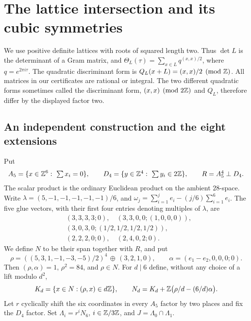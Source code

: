 \section{The lattice intersection and its cubic symmetries}
\label{sec:B}

We use positive definite lattices with roots of squared length two. Thus
\(\det L\) is the determinant of a Gram matrix, and
\(\Theta_L(\tau)=\sum_{x\in L}q^{(x,x)/2}\), where
\(q=e^{2\pi i\tau}\). The quadratic discriminant form is
\(Q_L(x+L)=(x,x)/2\pmod{\mathbb Z}\). All matrices in our certificates
are rational or integral. The two different quadratic forms sometimes
called the discriminant form, \((x,x)\pmod{2\mathbb Z}\) and \(Q_L\),
therefore differ by the displayed factor two.

\subsection{An independent construction and the eight extensions}

Put
\[
 A_5=\{x\in\mathbb Z^6:\ \textstyle\sum x_i=0\},\qquad
 D_4=\{y\in\mathbb Z^4:\ \textstyle\sum y_i\in2\mathbb Z\},\qquad
 R=A_5^4\perp D_4.
\]
The scalar product is the ordinary Euclidean product on the ambient
\(28\)-space. Write \(\lambda=(5,-1,-1,-1,-1,-1)/6\), and
\(\omega_j=\sum_{i=1}^j e_i-(j/6)\sum_{i=1}^6e_i\).
The five glue vectors, with their first four entries denoting multiples
of \(\lambda\), are
\begin{equation}\label{eq:B-glue}
\begin{split}
 &(3,3,3,3;0),\quad(3,3,0,0;(1,0,0,0)),\\
 &(3,0,3,0;(1/2,1/2,1/2,1/2)),\\
 &(2,2,2,0;0),\quad(2,4,0,2;0).
\end{split}
\end{equation}
We define \(N\) to be their span together with \(R\), and put
\[
 \rho=((5,3,1,-1,-3,-5)/2)^4\,\oplus\,(3,2,1,0),
 \qquad \alpha=(e_1-e_2,0,0,0;0).
\]
Then \((\rho,\alpha)=1\), \(\rho^2=84\), and \(\rho\in N\).
For \(d\mid6\) define, without any choice of a lift modulo \(d^2\),
\begin{equation}\label{eq:B-neighbor}
 K_d=\{x\in N:(\rho,x)\in d\mathbb Z\},\qquad
 N_d=K_d+\mathbb Z\bigl(\rho/d-(6/d)\alpha\bigr).
\end{equation}
Let \(r\) cyclically shift the six coordinates in every \(A_5\) factor
by two places and fix the \(D_4\) factor. Set
\(\Lambda_i=r^iN_6\), \(i\in\mathbb Z/3\mathbb Z\), and
\(J=\Lambda_0\cap\Lambda_1\).

